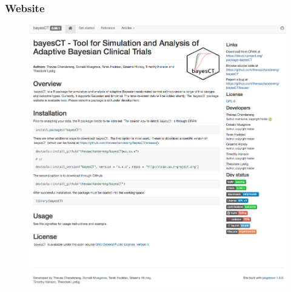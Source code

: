 \documentclass{beamer}
\begin{document}
\begin{frame}
\frametitle{Website}
\begin{figure}
\includegraphics[width=0.75\linewidth]{website.png}
\end{figure}
\end{frame}




%
%
\end{document}
